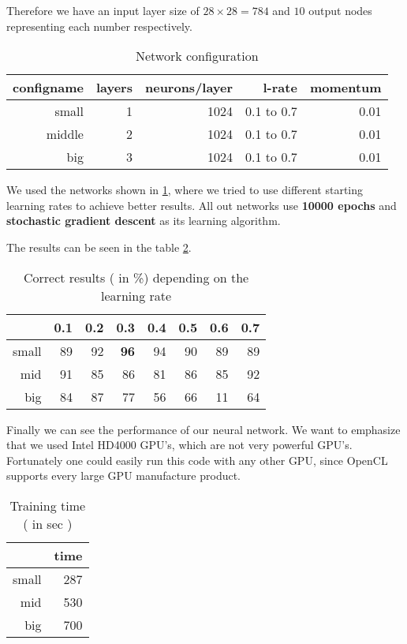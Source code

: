 \documentclass{acm_proc_article-sp}
\begin{document}
Therefore we have an input layer size of $28 \times 28= 784$ and $10$ output nodes representing each number respectively.

\begin{table}[h]
\centering
\caption{Network configuration}
\label{tab:config}
\begin{tabular}{rr|r|r|r}
\hline
configname & layers & neurons/layer& l-rate & momentum\\
\hline
small & 1 & 1024 & 0.1 to 0.7 & 0.01 \\
\hline
middle & 2 & 1024 & 0.1 to 0.7 & 0.01 \\
\hline
big & 3 & 1024 & 0.1 to 0.7 & 0.01\\
\hline
\end{tabular}
\end{table}
We used the networks shown in \ref{tab:config}, where we tried to use different starting learning rates to achieve better results.
All out networks use \textbf{10000 epochs} and \textbf{stochastic gradient descent} as its learning algorithm.


The results can be seen in the table \ref{tab:correct}. 
\begin{table}[h]
\centering
\caption{Correct results ( in \%) depending on the learning rate}
\label{tab:correct}
\begin{tabular}{r|r|r|r|r|r|r|r}
& 0.1 & 0.2 & 0.3 & 0.4 & 0.5 & 0.6 & 0.7 \\
\hline
small & 89 & 92 & \textbf{96} & 94 & 90 & 89 & 89 \\
\hline
mid & 91 &85 & 86 & 81 & 86 & 85 & 92 \\
\hline
big & 84 & 87 & 77 & 56 & 66 & 11 & 64  \\
\end{tabular}
\end{table}

Finally we can see the performance of our neural network. We want to emphasize that we used Intel HD4000 GPU's, which are not very powerful GPU's. Fortunately one could easily run this code with any other GPU, since OpenCL supports every large GPU manufacture product.

\begin{table}[h]
\centering
\caption{Training time ( in sec )}
\label{tab:traintime}
\begin{tabular}{r|r}
& time \\
\hline
small & 287 \\
\hline
mid & 530 \\
\hline
big &  700 \\
\end{tabular}
\end{table}
\end{document}
